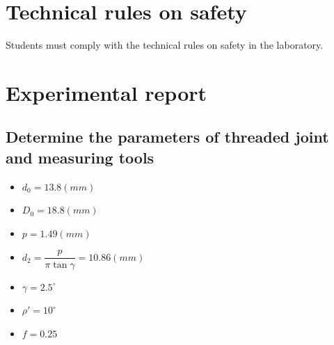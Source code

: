 \section{Technical rules on safety}
Students must comply with the technical rules on safety in the laboratory.

\section{Experimental report}

\subsection{Determine the parameters of threaded joint and measuring tools}
\begin{itemize}
	\item $ d_0=13.8\unit{(mm)} $
	\item $ D_0=18.8\unit{(mm)} $
	\item $ p=1.49\unit{(mm)} $
	\item $ d_2 = \dfrac{p}{\pi\tan\gamma} = 10.86\unit{(mm)}$
	\item $ \gamma=2.5^\circ $
	\item $ \rho'=10^\circ $
	\item $ f=0.25 $
\end{itemize}\clearpage

